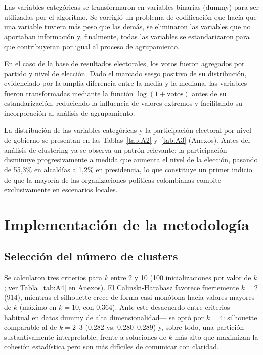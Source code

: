 \documentclass[11pt,letterpaper]{article}
\begin{document}
Las variables categóricas se transformaron en variables binarias (dummy) para ser utilizadas por el algoritmo. Se corrigió un problema de codificación que hacía que una variable tuviera más peso que las demás, se eliminaron las variables que no aportaban información y, finalmente, todas las variables se estandarizaron para que contribuyeran por igual al proceso de agrupamiento.

En el caso de la base de resultados electorales, los votos fueron agregados por partido y nivel de elección. Dado el marcado sesgo positivo de su distribución, evidenciado por la amplia diferencia entre la media y la mediana, las variables fueron transformadas mediante la función $\log(1+\text{votos})$ antes de su estandarización, reduciendo la influencia de valores extremos y facilitando su incorporación al análisis de agrupamiento.

La distribución de las variables categóricas y la participación electoral por nivel de gobierno se presentan en las Tablas~\ref{tab:A2} y~\ref{tab:A3} (Anexos). Antes del análisis de clustering ya se observa un patrón relevante: la participación disminuye progresivamente a medida que aumenta el nivel de la elección, pasando de 55,3\% en alcaldías a 1,2\% en presidencia, lo que constituye un primer indicio de que la mayoría de las organizaciones políticas colombianas compite exclusivamente en escenarios locales.

\section{Implementación de la metodología}

\subsection{Selección del número de clusters}

Se calcularon tres criterios para $k$ entre 2 y 10 (100 inicializaciones por valor de $k$; ver Tabla~\ref{tab:A4} en Anexos). El Calinski-Harabasz favorece fuertemente $k=2$ (914), mientras el silhouette crece de forma casi monótona hacia valores mayores de $k$ (máximo en $k=10$, con 0,364). Ante este desacuerdo entre criterios ---habitual en datos dummy de alta dimensionalidad--- se optó por $k=4$: silhouette comparable al de $k=2$--3 (0,282 vs. 0,280--0,289) y, sobre todo, una partición sustantivamente interpretable, frente a soluciones de $k$ más alto que maximizan la cohesión estadística pero son más difíciles de comunicar con claridad.
\end{document}
